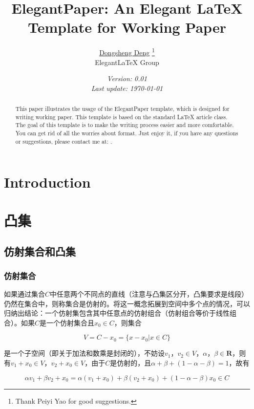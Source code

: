 \documentclass{elegantpaper}
\title{ElegantPaper: An Elegant \LaTeX{} Template for Working Paper}
\author{\href{https://ddswhu.me/}{Dongsheng Deng} %
		\thanks{Thank Peiyi Yao for good suggestions.} \\[0.5ex] %
		Elegant\LaTeX{} Group}
\date{\small\itshape Version: 0.01 \\ Last update: \today}
\begin{document}
\maketitle

\begin{abstract}
	This paper illustrates the usage of the ElegantPaper template, which is designed for writing working paper. This template is based on the standard \LaTeX{} article class. The goal of this template is to make the writing process easier and more comfortable. You can get rid of all the worries about format. Just enjoy it, if you have any questions or suggestions, please contact me at: .
\end{abstract}

\section{Introduction}

\section{凸集}

\subsection{仿射集合和凸集}

\subsubsection{仿射集合}

如果通过集合$C$中任意两个不同点的直线（注意与凸集区分开，凸集要求是线段）仍然在集合中，则称集合是仿射的。将这一概念拓展到空间中多个点的情况，可以归纳出结论：一个仿射集包含其中任意点的仿射组合（仿射组合等价于线性组合）。如果$C$是一个仿射集合且$x_0 \in C$，则集合

\begin{equation}
	V = C - x_0 = \{x-x_0|x \in C \}
\end{equation}

是一个子空间（即关于加法和数乘是封闭的），不妨设$v_1$，$v_2 \in V$，$\alpha$，$\beta \in \textbf{R}$，则有$v_1 + x_0 \in V$，$v_2 + x_0 \in V$，由于$C$是仿射的，且$\alpha + \beta + (1-\alpha-\beta) = 1$，故有

\begin{equation}
	\alpha v_1 + \beta v_2 + x_0 = \alpha (v_1 + x_0) + \beta (v_2 + x_0) + (1-\alpha-\beta)x_0 \in C
\end{equation}
\end{document}
